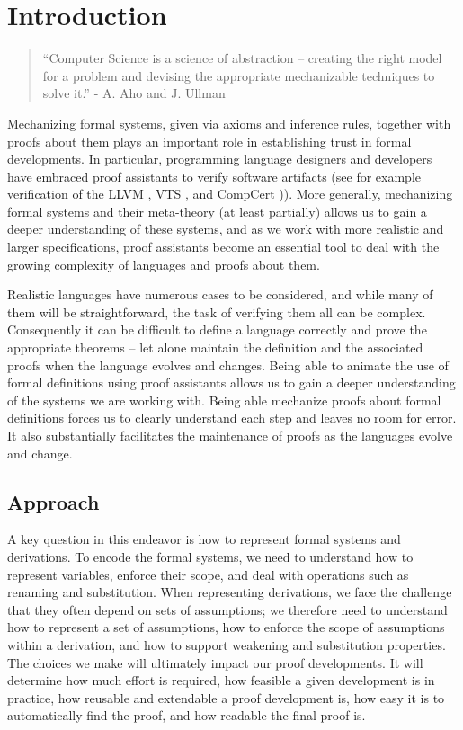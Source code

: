 \chapter{Introduction}
\begin{center}
  \begin{quote}
``Computer Science is a science of abstraction --
creating the right model for a problem and
devising the appropriate mechanizable techniques
to solve it.''
\hfill- A. Aho and J. Ullman
  \end{quote}
\end{center}

Mechanizing formal systems, given via axioms and inference rules,
together with proofs about them plays an important role in
establishing trust in formal developments. In particular, programming
language designers and developers have embraced proof assistants to
verify software artifacts (see for example verification of the LLVM
\citep{ZhaoNMZ12}, VTS \citep{Appel11}, and CompCert
\citep{Leroy-Compcert-CACM})). More generally, mechanizing formal
systems and their meta-theory (at least partially) allows us to gain a
deeper understanding of these systems, and as we work with more
realistic and larger specifications, proof assistants become an
essential tool to deal with the growing complexity of languages and
proofs about them. %

Realistic languages have numerous cases to be considered, and
while many of them will be straightforward, the task of verifying them
all can be complex. Consequently it can be difficult to define a language
correctly and prove the appropriate theorems -- let alone maintain
the definition and the associated proofs when the language evolves and
changes.  Being able to animate the use of formal definitions using
proof assistants allows us to gain a deeper understanding of the
systems we are working with. Being able mechanize proofs about formal
definitions forces us to clearly understand each step and leaves no
room for error.  It also substantially facilitates the maintenance of
proofs as the languages evolve and change.


\section{Approach}

A key question in this endeavor is how to represent formal systems and
derivations. To encode the formal systems, we need to understand how
to represent variables, enforce their scope, and deal with operations
such as renaming and substitution. When representing derivations, we
face the challenge that they often depend on sets of assumptions; we
therefore need to understand how to represent a set of assumptions,
how to enforce the scope of assumptions within a derivation, and how
to support weakening and substitution properties. The choices we make
will ultimately  impact our proof developments. It will determine
how much effort is required, how feasible a given development is in
practice, how reusable and extendable a proof development is, how easy
it is to automatically find the proof, and how readable the final proof is.

